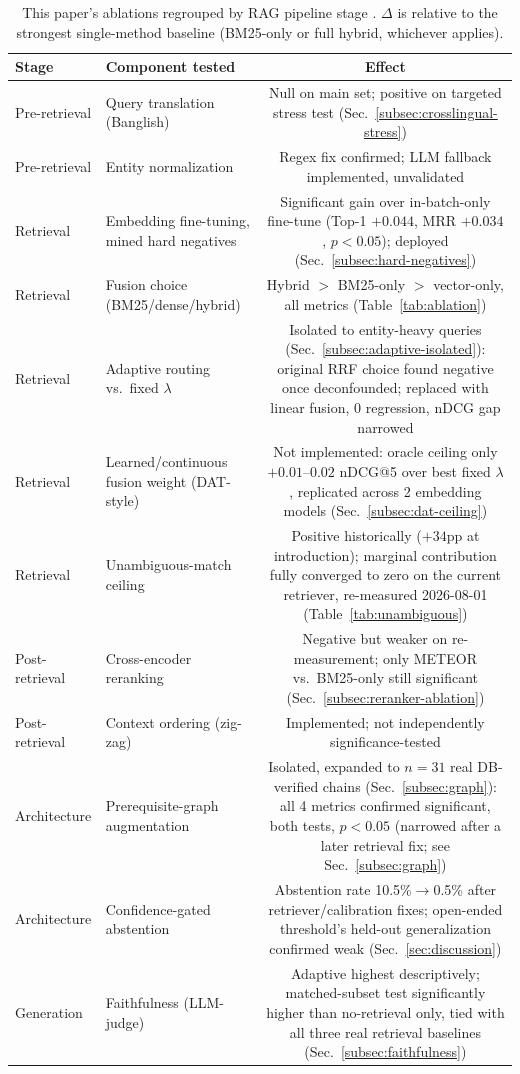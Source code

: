 \documentclass[a4paper,twoside]{article}
\begin{document}
\begin{table}[t]
\caption{This paper's ablations regrouped by RAG pipeline stage \citep{huang2026survey}. $\Delta$ is relative to the strongest single-method baseline (BM25-only or full hybrid, whichever applies).}\label{tab:by-stage} \centering
\begin{tabular}{|l|l|c|}
\hline
Stage & Component tested & Effect \\
\hline
Pre-retrieval & Query translation (Banglish) & Null on main set; positive on targeted stress test (Sec.~\ref{subsec:crosslingual-stress}) \\
Pre-retrieval & Entity normalization & Regex fix confirmed; LLM fallback implemented, unvalidated \\
Retrieval & Embedding fine-tuning, mined hard negatives & Significant gain over in-batch-only fine-tune (Top-1 $+0.044$, MRR $+0.034$, $p<0.05$); deployed (Sec.~\ref{subsec:hard-negatives}) \\
Retrieval & Fusion choice (BM25/dense/hybrid) & Hybrid $>$ BM25-only $>$ vector-only, all metrics (Table~\ref{tab:ablation}) \\
Retrieval & Adaptive routing vs.\ fixed $\lambda$ & Isolated to entity-heavy queries (Sec.~\ref{subsec:adaptive-isolated}): original RRF choice found negative once deconfounded; replaced with linear fusion, 0 regression, nDCG gap narrowed \\
Retrieval & Learned/continuous fusion weight (DAT-style) & Not implemented: oracle ceiling only $+0.01$--$0.02$ nDCG@5 over best fixed $\lambda$, replicated across 2 embedding models (Sec.~\ref{subsec:dat-ceiling}) \\
Retrieval & Unambiguous-match ceiling & Positive historically ($+34$pp at introduction); marginal contribution fully converged to zero on the current retriever, re-measured 2026-08-01 (Table~\ref{tab:unambiguous}) \\
Post-retrieval & Cross-encoder reranking & Negative but weaker on re-measurement; only METEOR vs.\ BM25-only still significant (Sec.~\ref{subsec:reranker-ablation}) \\
Post-retrieval & Context ordering (zig-zag) & Implemented; not independently significance-tested \\
Architecture & Prerequisite-graph augmentation & Isolated, expanded to $n=31$ real DB-verified chains (Sec.~\ref{subsec:graph}): all 4 metrics confirmed significant, both tests, $p<0.05$ (narrowed after a later retrieval fix; see Sec.~\ref{subsec:graph}) \\
Architecture & Confidence-gated abstention & Abstention rate 10.5\%$\to$0.5\% after retriever/calibration fixes; open-ended threshold's held-out generalization confirmed weak (Sec.~\ref{sec:discussion}) \\
Generation & Faithfulness (LLM-judge) & Adaptive highest descriptively; matched-subset test significantly higher than no-retrieval only, tied with all three real retrieval baselines (Sec.~\ref{subsec:faithfulness}) \\
\hline
\end{tabular}
\end{table}
\end{document}
